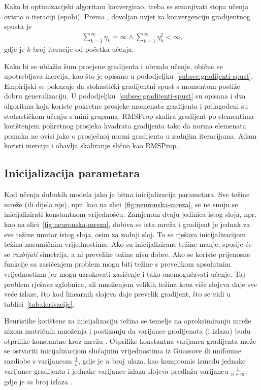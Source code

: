 \documentclass[utf8, diplomski, lmodern]{fer}
\begin{document}
Kako bi optimizacijski algoritam konvergirao, treba se smanjivati stopa učenja ovisno o iteraciji (epohi). Prema \cite{Goodfellow:2016:DL}, dovoljan uvjet za konvergenciju gradijentnog spusta je
\begin{align}
\sum_{k=1}^\infty \eta_k=\infty \wedge \sum_{k=1}^\infty \eta_k^2<\infty \text{,}
\end{align}
gdje je $k$ broj iteracije od početka učenja.

Kako bi se ublažio šum procjene gradijenta i ubrzalo učenje, obično se upotrebljava inercija, kao što je opisano u pododjeljku~\ref{subsec:gradijenti-spust}. Empirijski se pokazuje da stohastički gradijentni spust s momentom postiže dobru generalizaciju. U pododjeljku~\ref{subsec:gradijenti-spust} su opisana i dva algoritma koja koriste pokretne prosjeke momenata gradijenta i prilagođeni su stohastičkom učenju s mini-grupama. RMSProp skalira gradijent po elementima korištenjem pokretnog prosjeka kvadrata gradijenta tako da norma elemenata pomaka ne ovisi jako o prosječnoj normi gradijenta u zadnjim iteracijama. Adam koristi inerciju i obavlja skaliranje slično kao RMSProp.


\subsection{Inicijalizacija parametara}

Kod učenja dubokih modela jako je bitna inicijalizacija parametara. Sve težine mreže (ili dijela nje), npr. kao na slici~\ref{fig:neuronska-mreza}, se ne smiju se inicijalizirati konstantnom vrijednošću. Zamjenom dvaju jedinica istog sloja, npr. kao na slici~\ref{fig:neuronska-mreza}, dobiva se ista mreža i gradijent je jednak za sve težine unutar istog sloja, osim za zadnji sloj. To se rješava inicijalizacijom težina nasumičnim vrijednostima. Ako su inicijalizirane težine manje, sporije će se \textit{razbijati} simetrija, a ni prevelike težine nisu dobre. Ako se koriste prijenosne funkcije sa zasićenjem problem mogu biti težine s prevelikom apsolutnim vrijednostima jer mogu uzrokovati zasićenje i tako onemogućavati učenje. Taj problem rješava zglobnica, ali množenjem velikih težina kroz više slojeva daje sve veće izlaze, što kod linearnih slojeva daje prevelik gradijent, što se vidi u tablici~\ref{tab:derivacije}.

Heuristike korištene za inicijalizaciju težina se temelje na aproksimiranju mreže nizom matričnih množenja i postizanju da varijance gradijenata (i izlaza) budu otprilike konstantne kroz mrežu \citep{Goodfellow:2016:DL}. Otprilike konstantna varijanca gradijenta može se ostvariti inicijalizacijom slučajnim vrijednostima iz Guassove ili unifomne razdiobe s varijancom $\frac{1}{n}$, gdje je $n$ broj ulaza. \citet{Glorot:2010:UDTDFNN} kao kompromis između jednake varijance gradijenta i jednake varijance izlaza slojeva predlažu varijancu $\frac{1}{n+m}$, gdje je $m$ broj izlaza \citep{Goodfellow:2016:DL}.
\end{document}
